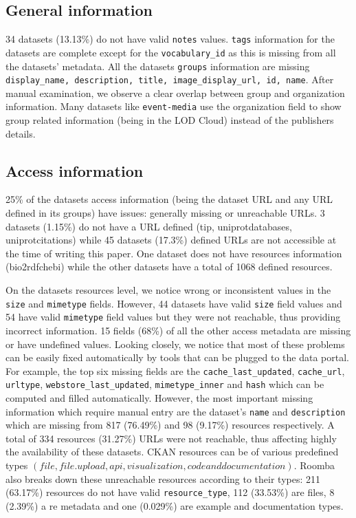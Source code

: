 \documentclass[runningheads,a4paper]{../../Tools/LaTEX/llncs}
\begin{document}
\subsection{General information}
34 datasets (13.13\%) do not have valid \texttt{notes} values. \texttt{tags} information for the datasets are complete except for the \texttt{vocabulary\_id} as this is missing from all the datasets' metadata. All the datasets \texttt{groups} information are missing \texttt{display\_name, description, title, image\_display\_url, id, name}. After manual examination, we observe a clear overlap between group and organization information. Many datasets like \texttt{event-media} use the organization field to show group related information (being in the LOD Cloud) instead of the publishers details.

\subsection{Access information}
25\% of the datasets access information (being the dataset URL and any URL defined in its groups) have issues: generally missing or unreachable URLs. 3 datasets (1.15\%) do not have a URL defined (tip, uniprot\-databases, uniprot\-citations) while 45 datasets (17.3\%) defined URLs are not accessible at the time of writing this paper. One dataset does not have resources information (bio2rdf\-chebi) while the other datasets have a total of 1068 defined resources.

On the datasets resources level, we notice wrong or inconsistent values in the \texttt{size} and \texttt{mimetype} fields. However, 44 datasets have valid \texttt{size} field values and 54 have valid \texttt{mimetype} field values but they were not reachable, thus providing incorrect information. 15 fields (68\%) of all the other access metadata are missing or have undefined values. Looking closely, we notice that most of these problems can be easily fixed automatically by tools that can be plugged to the data portal. For example, the top six missing fields are the \texttt{cache\_last\_updated}, \texttt{cache\_url}, \texttt{url\-type}, \texttt{webstore\_last\_updated}, \texttt{mimetype\-\_inner} and \texttt{hash} which can be computed and filled automatically. However, the most important missing information which require manual entry are the dataset's \texttt{name} and \texttt{description} which are missing from 817 (76.49\%) and 98 (9.17\%) resources respectively. A total of 334 resources (31.27\%) URLs were not reachable, thus affecting highly the availability of these datasets. CKAN resources can be of various predefined types $(file, file.upload, api, visualization, code and documentation)$. Roomba also breaks down these unreachable resources according to their types: 211 (63.17\%) resources do not have valid \texttt{resource\_type}, 112 (33.53\%) are files, 8 (2.39\%) a re metadata and one (0.029\%) are example and documentation types.
\end{document}
